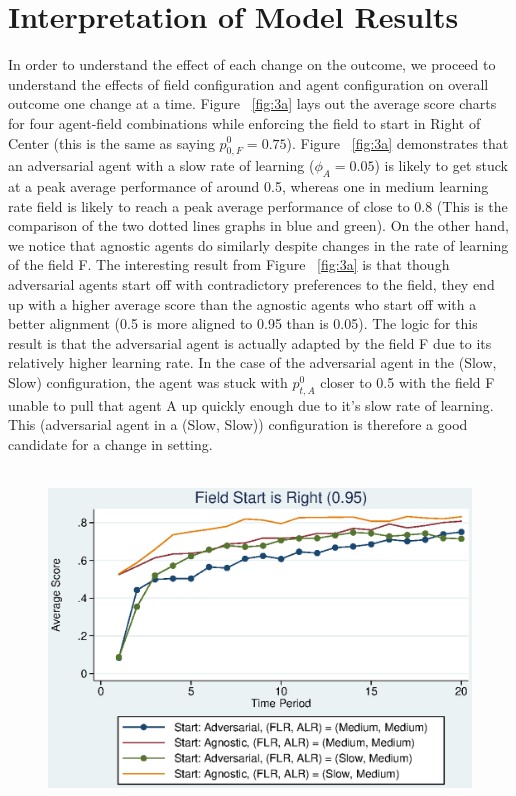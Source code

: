 \documentclass[12pt]{article}
\begin{document}
\section{Interpretation of Model Results}
\noindent In order to understand the effect of each change on the outcome, we proceed to understand the effects of field configuration and agent configuration on overall outcome one change at a time. Figure ~\ref{fig:3a} lays out the average score charts for four agent-field combinations while enforcing the field to start in Right of Center (this is the same as saying $p_{0,F}^0 = 0.75$). Figure ~\ref{fig:3a} demonstrates that an adversarial agent with a slow rate of learning ($\phi_A = 0.05$) is likely to get stuck at a peak average performance of around 0.5, whereas one in medium learning rate field is likely to reach a peak average performance of close to 0.8 (This is the comparison of the two dotted lines graphs in blue and green). On the other hand, we notice that agnostic agents do similarly despite changes in the rate of learning of the field F. The interesting result from Figure ~\ref{fig:3a} is that though adversarial agents start off with contradictory preferences to the field, they end up with a higher average score than the agnostic agents who start off with a better alignment (0.5 is more aligned to 0.95 than is 0.05). The logic for this result is that the adversarial agent is actually adapted by the field F due to its relatively higher learning rate. In the case of the adversarial agent in the (Slow, Slow) configuration, the agent was stuck with $p_{t,A}^0$ closer to 0.5 with the field F unable to pull that agent A up quickly enough due to it's slow rate of learning. This (adversarial agent in a (Slow, Slow)) configuration is therefore a good candidate for a change in setting.\\\\



\begin{figure}[h]
\begin{centering}
  \includegraphics[width=\textwidth]{frcmedium3c}
  \caption{}
  \label{fig:3c}
\end{centering}
\end{figure}
\end{document}
